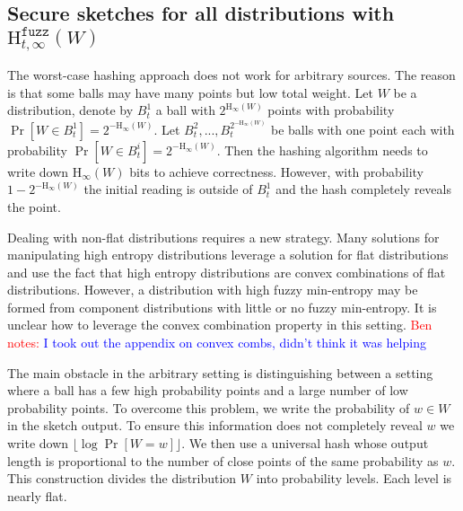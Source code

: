 \documentclass[11pt]{article}
\newcommand{\apref}[1]{\mbox{Appendix~\ref{#1}}}
\newcommand{\Hoo}{\mathrm{H}_\infty}
\newcommand{\Hfuzz}{\mathrm{H}^{\mathtt{fuzz}}_{t,\infty}}
\newcommand{\authnote}[2]{{\textcolor{red}{\textsf{#1 notes: }\textcolor{blue}{ #2}}\marginpar{\textcolor{red}{\textbf{!!!!!}}}}}
\newcommand{\authnote}[2]{}
\newcommand{\bnote}[1]{{\authnote{Ben}{#1}}}
\begin{document}
\subsection{Secure sketches for all distributions with $\Hfuzz(W)$}
The worst-case hashing approach does not work for arbitrary sources.  The reason is that some balls may have  many points but low total weight.  Let $W$ be a distribution, denote by $B^1_t$ a ball with $2^{\Hoo(W)}$ points with probability $\Pr[W\in B^1_t] =2^{-\Hoo(W)}$.  Let $B^2_t,..., B^{2^{-\Hoo(W)}}_t$ be balls with one point each with probability $\Pr[W\in B^i_t] = 2^{-\Hoo(W)}$.  Then the hashing algorithm needs to write down $\Hoo(W)$ bits to achieve correctness.  However, with probability $1-2^{-\Hoo(W)}$ the initial reading is outside of $B^1_t$ and the hash completely reveals the point.  

Dealing with non-flat distributions requires a new strategy. 
Many solutions for manipulating high entropy distributions leverage a solution for flat distributions and use the fact that high entropy distributions are convex combinations of flat distributions.  However, a distribution with high fuzzy min-entropy may be formed from component distributions with little or no fuzzy min-entropy.  It is unclear how to leverage the convex combination property in this setting.  \bnote{I took out the appendix on convex combs, didn't think it was helping}%

The main obstacle in the arbitrary setting is distinguishing between a setting where a ball has a few high probability points and a large number of low probability points.
To overcome this problem, we write the probability of $w\in W$ in the sketch output.  To ensure this information does not completely reveal $w$ we write down $\lfloor \log \Pr[W=w] \rfloor$. We then use a universal hash whose output length is proportional to the number of close points of the same probability as $w$.  This construction divides the distribution $W$ into probability levels.  Each level is nearly flat.  
\end{document}
